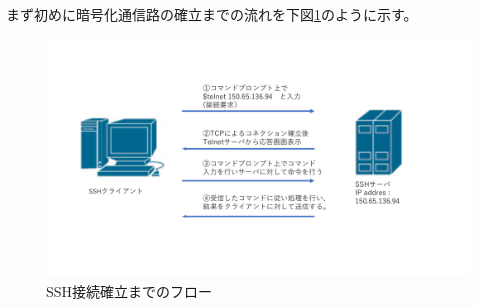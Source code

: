 \documentclass[11pt,a4j,titlepage]{jreport}
\begin{document}
まず初めに暗号化通信路の確立までの流れを下図\ref{SSH_flow}のように示す。
\begin{figure}[h]
    \centering
    \includegraphics[width=1.0\textwidth, page=5]{graphs/network_archtecture.pdf}
    \caption{SSH接続確立までのフロー}
    \label{SSH_flow}
\end{figure}

\end{document}
